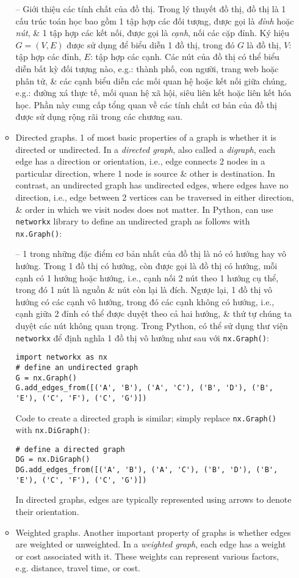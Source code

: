 \documentclass{article}
\begin{document}
\begin{itemize}
\begin{itemize}
        -- {\sf Giới thiệu các tính chất của đồ thị.} Trong lý thuyết đồ thị, đồ thị là 1 cấu trúc toán học bao gồm 1 tập hợp các đối tượng, được gọi là {\it đỉnh} hoặc {\it nút}, \& 1 tập hợp các kết nối, được gọi là {\it cạnh}, nối các cặp đỉnh. Ký hiệu $G = (V,E)$ được sử dụng để biểu diễn 1 đồ thị, trong đó $G$ là đồ thị, $V$: tập hợp các đỉnh, $E$: tập hợp các cạnh. Các nút của đồ thị có thể biểu diễn bất kỳ đối tượng nào, e.g.: thành phố, con người, trang web hoặc phân tử, \& các cạnh biểu diễn các mối quan hệ hoặc kết nối giữa chúng, e.g.: đường xá thực tế, mối quan hệ xã hội, siêu liên kết hoặc liên kết hóa học. Phần này cung cấp tổng quan về các tính chất cơ bản của đồ thị được sử dụng rộng rãi trong các chương sau.
        \item {\sf Directed graphs.} 1 of most basic properties of a graph is whether it is directed or undirected. In a {\it directed graph}, also called a {\it digraph}, each edge has a direction or orientation, i.e., edge connects 2 nodes in a particular direction, where 1 node is source \& other is destination. In contrast, an undirected graph has undirected edges, where edges have no direction, i.e., edge between 2 vertices can be traversed in either direction, \& order in which we visit nodes does not matter. In Python, can use {\tt networkx} library to define an undirected graph as follows with {\tt nx.Graph()}:

        -- 1 trong những đặc điểm cơ bản nhất của đồ thị là nó có hướng hay vô hướng. Trong 1 đồ thị có hướng, còn được gọi là đồ thị có hướng, mỗi cạnh có 1 hướng hoặc hướng, i.e., cạnh nối 2 nút theo 1 hướng cụ thể, trong đó 1 nút là nguồn \& nút còn lại là đích. Ngược lại, 1 đồ thị vô hướng có các cạnh vô hướng, trong đó các cạnh không có hướng, i.e., cạnh giữa 2 đỉnh có thể được duyệt theo cả hai hướng, \& thứ tự chúng ta duyệt các nút không quan trọng. Trong Python, có thể sử dụng thư viện {\tt networkx} để định nghĩa 1 đồ thị vô hướng như sau với {\tt nx.Graph()}:
        \begin{verbatim}
import networkx as nx
# define an undirected graph
G = nx.Graph()
G.add_edges_from([('A', 'B'), ('A', 'C'), ('B', 'D'), ('B', 'E'), ('C', 'F'), ('C', 'G')])
        \end{verbatim}
        Code to create a directed graph is similar; simply replace {\tt nx.Graph()} with {\tt nx.DiGraph()}:
        \begin{verbatim}
# define a directed graph
DG = nx.DiGraph()
DG.add_edges_from([('A', 'B'), ('A', 'C'), ('B', 'D'), ('B', 'E'), ('C', 'F'), ('C', 'G')])
        \end{verbatim}
        In directed graphs, edges are typically represented using arrows to denote their orientation.
        \item {\sf Weighted graphs.} Another important property of graphs is whether edges are weighted or unweighted. In a {\it weighted graph}, each edge has a weight or cost associated with it. These weights can represent various factors, e.g. distance, travel time, or cost.


\end{itemize}
\end{itemize}
\end{document}
